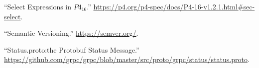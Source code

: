 \documentclass[11pt]{article}
\begin{document}
{{\begin{thebibliography}{40}
\mdbibitemlabel{{}[27]}\textquotedblleft{}Select Expressions in $P4_{16}$.\textquotedblright{} \href{https://p4.org/p4-spec/docs/P4-16-v1.2.1.html\%23sec-select}{{\ttfamily https://\hspace{0pt}p4.\hspace{0pt}org/\hspace{0pt}p4-\hspace{0pt}spec/\hspace{0pt}docs/\hspace{0pt}P4-\hspace{0pt}16-\hspace{0pt}v1.\hspace{0pt}2.\hspace{0pt}1.\hspace{0pt}html\#\hspace{0pt}sec-\hspace{0pt}select}}.\label{p4selectexpr}%

\mdbibitemlabel{{}[28]}\textquotedblleft{}Semantic Versioning.\textquotedblright{} \href{https://semver.org/}{{\ttfamily https://\hspace{0pt}semver.\hspace{0pt}org/\hspace{0pt}}}.\label{semver}%

\mdbibitemlabel{{}[29]}\textquotedblleft{}Status.proto:the Protobuf Status Message.\textquotedblright{} \href{https://github.com/grpc/grpc/blob/master/src/proto/grpc/status/status.proto}{{\ttfamily https://\hspace{0pt}github.\hspace{0pt}com/\hspace{0pt}grpc/\hspace{0pt}grpc/\hspace{0pt}blob/\hspace{0pt}master/\hspace{0pt}src/\hspace{0pt}proto/\hspace{0pt}grpc/\hspace{0pt}status/\hspace{0pt}status.\hspace{0pt}proto}}.\label{protostatus}%


\end{thebibliography}}}
\end{document}
